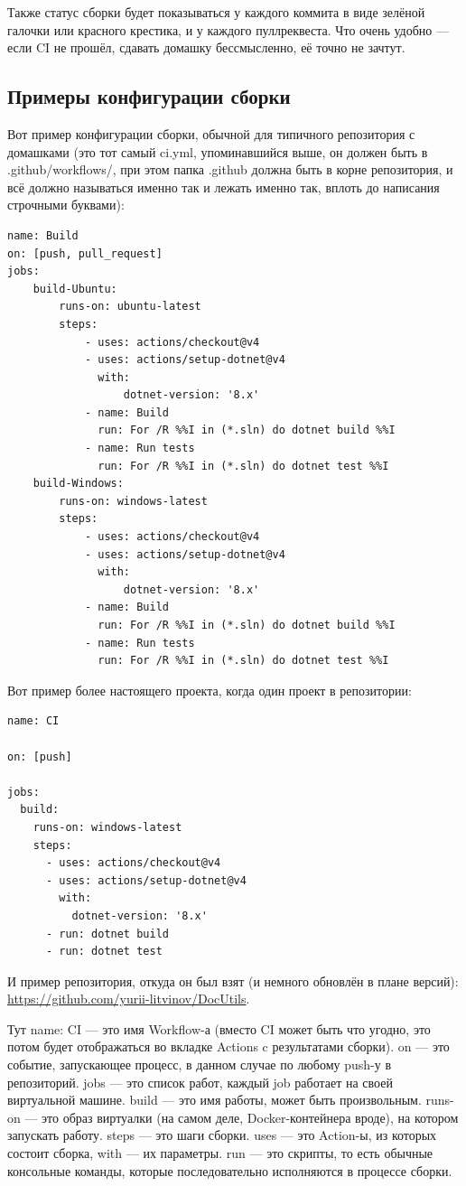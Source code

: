 \documentclass{../../text-style}
\begin{document}
Также статус сборки будет показываться у каждого коммита в виде зелёной галочки или красного крестика, и у каждого пуллреквеста. Что очень удобно --- если CI не прошёл, сдавать домашку бессмысленно, её точно не зачтут.

\subsection{Примеры конфигурации сборки}

Вот пример конфигурации сборки, обычной для типичного репозитория с домашками (это тот самый ci.yml, упоминавшийся выше, он должен быть в .github/workflows/, при этом папка .github должна быть в корне репозитория, и всё должно называться именно так и лежать именно так, вплоть до написания строчными буквами):

\begin{verbatim}
name: Build
on: [push, pull_request]
jobs:
    build-Ubuntu:
        runs-on: ubuntu-latest
        steps:
            - uses: actions/checkout@v4
            - uses: actions/setup-dotnet@v4
              with:
                  dotnet-version: '8.x'
            - name: Build
              run: For /R %%I in (*.sln) do dotnet build %%I
            - name: Run tests
              run: For /R %%I in (*.sln) do dotnet test %%I
    build-Windows:
        runs-on: windows-latest
        steps:
            - uses: actions/checkout@v4
            - uses: actions/setup-dotnet@v4
              with:
                  dotnet-version: '8.x'
            - name: Build
              run: For /R %%I in (*.sln) do dotnet build %%I
            - name: Run tests
              run: For /R %%I in (*.sln) do dotnet test %%I
\end{verbatim}

Вот пример более настоящего проекта, когда один проект в репозитории:

\begin{verbatim}
name: CI

on: [push]

jobs:
  build:
    runs-on: windows-latest
    steps:
      - uses: actions/checkout@v4
      - uses: actions/setup-dotnet@v4
        with:
          dotnet-version: '8.x' 
      - run: dotnet build 
      - run: dotnet test
\end{verbatim}

И пример репозитория, откуда он был взят (и немного обновлён в плане версий): \url{https://github.com/yurii-litvinov/DocUtils}.

Тут name: CI --- это имя Workflow-а (вместо CI может быть что угодно, это потом будет отображаться во вкладке Actions c результатами сборки). on --- это событие, запускающее процесс, в данном случае по любому push-у в репозиторий. jobs --- это список работ, каждый job работает на своей виртуальной машине. build --- это имя работы, может быть произвольным. runs-on --- это образ виртуалки (на самом деле, Docker-контейнера вроде), на котором запускать работу. steps --- это шаги сборки. uses --- это Action-ы, из которых состоит сборка, with --- их параметры. run --- это скрипты, то есть обычные консольные команды, которые последовательно исполняются в процессе сборки.
\end{document}
